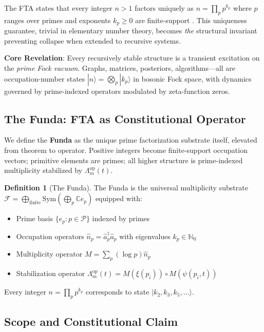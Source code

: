 \documentclass[11pt,a4paper]{article}
\theoremstyle{plain}
\theoremstyle{definition}
\newtheorem{definition}[theorem]{Definition}
\theoremstyle{remark}
\begin{document}
The FTA states that every integer \(n > 1\) factors uniquely as \(n = \prod_p p^{k_p}\) where \(p\) ranges over primes and exponents \(k_p \geq 0\) are finite-support \cite{Hardy1979}. This uniqueness guarantee, trivial in elementary number theory, becomes \emph{the} structural invariant preventing collapse when extended to recursive systems.

\textbf{Core Revelation}: Every recursively stable structure is a transient excitation on the \emph{prime Fock vacuum}. Graphs, matrices, posteriors, algorithms---all are occupation-number states \(|n\rangle = \bigotimes_p |k_p\rangle\) in bosonic Fock space, with dynamics governed by prime-indexed operators modulated by zeta-function zeros.

\subsection{The Funda: FTA as Constitutional Operator}

We define the \textbf{Funda} as the unique prime factorization substrate itself, elevated from theorem to operator. Positive integers become finite-support occupation vectors; primitive elements are primes; all higher structure is prime-indexed multiplicity stabilized by \(\Lambda_m^{\text{op}}(t)\).

\begin{definition}[The Funda]
The Funda is the universal multiplicity substrate \(\mathcal{F} = \bigoplus_{\text{finite}} \text{Sym}(\bigoplus_p \mathbb{C} e_p)\) equipped with:
\begin{itemize}[leftmargin=*]
\item Prime basis \(\{e_p : p \in \mathcal{P}\}\) indexed by primes
\item Occupation operators \(\hat{n}_p = \hat{a}_p^\dagger \hat{a}_p\) with eigenvalues \(k_p \in \mathbb{N}_0\)
\item Multiplicity operator \(M = \sum_p (\log p) \hat{n}_p\)
\item Stabilization operator \(\Lambda_m^{\text{op}}(t) = M(\xi(p_i)) \circ M(\psi(p_i,t))\)
\end{itemize}
Every integer \(n = \prod_p p^{k_p}\) corresponds to state \(|k_2, k_3, k_5, \ldots\rangle\).
\end{definition}

\subsection{Scope and Constitutional Claim}
\end{document}
